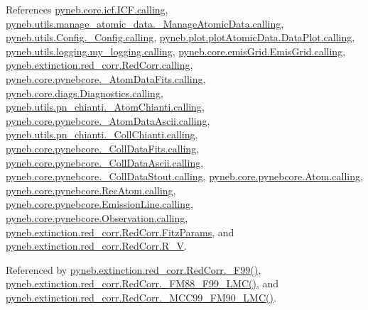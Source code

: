 \begin{DoxyVerb}
References \hyperlink{icf_8py_source_l00016}{pyneb.\-core.\-icf.\-I\-C\-F.\-calling}, \hyperlink{manage__atomic__data_8py_source_l00018}{pyneb.\-utils.\-manage\-\_\-atomic\-\_\-data.\-\_\-\-Manage\-Atomic\-Data.\-calling}, \hyperlink{_config_8py_source_l00032}{pyneb.\-utils.\-Config.\-\_\-\-Config.\-calling}, \hyperlink{plot_atomic_data_8py_source_l00042}{pyneb.\-plot.\-plot\-Atomic\-Data.\-Data\-Plot.\-calling}, \hyperlink{logging_8py_source_l00044}{pyneb.\-utils.\-logging.\-my\-\_\-logging.\-calling}, \hyperlink{emis_grid_8py_source_l00044}{pyneb.\-core.\-emis\-Grid.\-Emis\-Grid.\-calling}, \hyperlink{red__corr_8py_source_l00059}{pyneb.\-extinction.\-red\-\_\-corr.\-Red\-Corr.\-calling}, \hyperlink{pynebcore_8py_source_l00097}{pyneb.\-core.\-pynebcore.\-\_\-\-Atom\-Data\-Fits.\-calling}, \hyperlink{diags_8py_source_l00169}{pyneb.\-core.\-diags.\-Diagnostics.\-calling}, \hyperlink{pn__chianti_8py_source_l00240}{pyneb.\-utils.\-pn\-\_\-chianti.\-\_\-\-Atom\-Chianti.\-calling}, \hyperlink{pynebcore_8py_source_l00318}{pyneb.\-core.\-pynebcore.\-\_\-\-Atom\-Data\-Ascii.\-calling}, \hyperlink{pn__chianti_8py_source_l00434}{pyneb.\-utils.\-pn\-\_\-chianti.\-\_\-\-Coll\-Chianti.\-calling}, \hyperlink{pynebcore_8py_source_l00585}{pyneb.\-core.\-pynebcore.\-\_\-\-Coll\-Data\-Fits.\-calling}, \hyperlink{pynebcore_8py_source_l00936}{pyneb.\-core.\-pynebcore.\-\_\-\-Coll\-Data\-Ascii.\-calling}, \hyperlink{pynebcore_8py_source_l01156}{pyneb.\-core.\-pynebcore.\-\_\-\-Coll\-Data\-Stout.\-calling}, \hyperlink{pynebcore_8py_source_l01229}{pyneb.\-core.\-pynebcore.\-Atom.\-calling}, \hyperlink{pynebcore_8py_source_l02643}{pyneb.\-core.\-pynebcore.\-Rec\-Atom.\-calling}, \hyperlink{pynebcore_8py_source_l03385}{pyneb.\-core.\-pynebcore.\-Emission\-Line.\-calling}, \hyperlink{pynebcore_8py_source_l03541}{pyneb.\-core.\-pynebcore.\-Observation.\-calling}, \hyperlink{red__corr_8py_source_l00078}{pyneb.\-extinction.\-red\-\_\-corr.\-Red\-Corr.\-Fitz\-Params}, and \hyperlink{red__corr_8py_source_l00204}{pyneb.\-extinction.\-red\-\_\-corr.\-Red\-Corr.\-R\-\_\-\-V}.



Referenced by \hyperlink{red__corr_8py_source_l00822}{pyneb.\-extinction.\-red\-\_\-corr.\-Red\-Corr.\-\_\-\-F99()}, \hyperlink{red__corr_8py_source_l00851}{pyneb.\-extinction.\-red\-\_\-corr.\-Red\-Corr.\-\_\-\-F\-M88\-\_\-\-F99\-\_\-\-L\-M\-C()}, and \hyperlink{red__corr_8py_source_l00789}{pyneb.\-extinction.\-red\-\_\-corr.\-Red\-Corr.\-\_\-\-M\-C\-C99\-\_\-\-F\-M90\-\_\-\-L\-M\-C()}.



\end{DoxyVerb}
